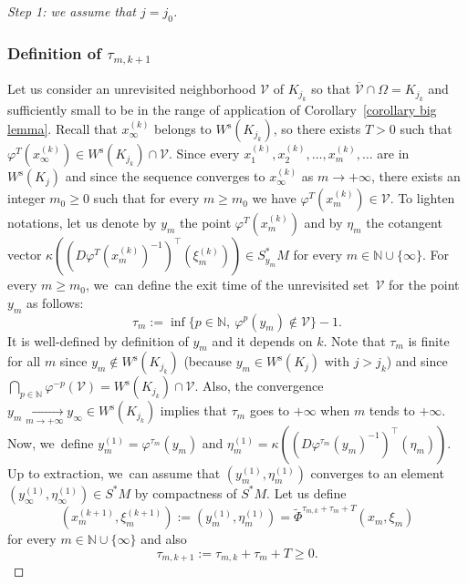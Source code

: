 \documentclass[11pt]{article}
\newcommand{\rs}{\mathrm{s}}
\theoremstyle{definition}
\theoremstyle{plain}
\newcommand{\N}{\mathbb{N}}
\newcommand{\Vcal}{\mathcal{V}}
\begin{document}
\begin{proof}[Step 1: we assume that $j = j_0$]
\subsubsection*{Definition of $\tau_{m,k+1}$} Let us consider an unrevisited neighborhood $\Vcal$ of $K_{j_k}$ so that $\overline{\Vcal} \cap \Omega = K_{j_k}$ and sufficiently small to be in the range of application of Corollary~\ref{corollary big lemma}. Recall that $x_{\infty}^{(k)}$ belongs to $W^\rs (K_{j_k})$, so there exists $T > 0$ such that $\varphi^T (x_{\infty}^{(k)}) \in W^\rs (K_{j_k}) \cap \Vcal$. Since every $x_{1}^{(k)}, x_{2}^{(k)},\dots, x_{m}^{(k)},\dots$ are in $W^\rs (K_{j})$ and since the sequence converges to $x_{\infty}^{(k)}$ as $m \to + \infty$, there exists an integer $m_0 \geq 0$ such that for every $m \geq m_0$ we have $\varphi^T (x_m^{(k)}) \in \Vcal$.
To lighten notations, let us denote by $y_m$ the point $\varphi^T (x_{m}^{(k)})$ and by $\eta_m$ the cotangent vector $\kappa ((D \varphi^{T} (x_m^{(k)})^{-1})^{\top} (\xi_m^{(k)})) \in S_{y_m}^* M$ for every $m \in \N \cup \{ \infty \}$.
For every $m \geq m_0$, we~can define the exit time of the unrevisited set~$\Vcal$ for the point~$y_m$ as follows:
\[
\tau_m:= \inf \{ p \in \N, \: \varphi^p (y_m) \notin \Vcal \} -1.
\]
It is well-defined by definition of $y_m$ and it depends on $k$. Note that $\tau_m$ is finite for all $m$ since $y_m \notin W^\rs (K_{j_k})$ (because $y_m \in W^\rs (K_j)$ with $j > j_k$) and since $\bigcap_{p \in \N} \varphi^{-p} (\Vcal) = W^\rs (K_{j_k}) \cap \Vcal$. Also, the convergence $y_m \underset{m \to +\infty}{\to} y_{\infty} \in W^\rs (K_{j_k})$ implies that $\tau_m$ goes to $+\infty$ when $m$ tends to $+\infty$. Now, we~define $y_m^{(1)} = \varphi^{\tau_m} (y_m)$ and $\eta_m^{(1)} = \kappa ((D\varphi^{\tau_m} (y_m)^{-1})^{ \top} (\eta_m))$. Up to extraction, we~can assume that $(y_m^{(1)}, \eta_m^{(1)})$ converges to an element $(y_{\infty}^{(1)},\eta_{\infty}^{(1)}) \in S^*M$ by compactness of $S^* M$. Let us define
\[
(x_m^{(k+1)}, \xi_m^{(k+1)}):= (y_m^{(1)}, \eta_m^{(1)}) = \widetilde{\Phi}^{\tau_{m,k} + \tau_m + T} (x_m, \xi_m)
\]
for every $m \in \N \cup \{ \infty \}$ and also
\[
\tau_{m, k+ 1}:= \tau_{m,k} + \tau_m + T \geq 0.
\]

\end{proof}
\end{document}
